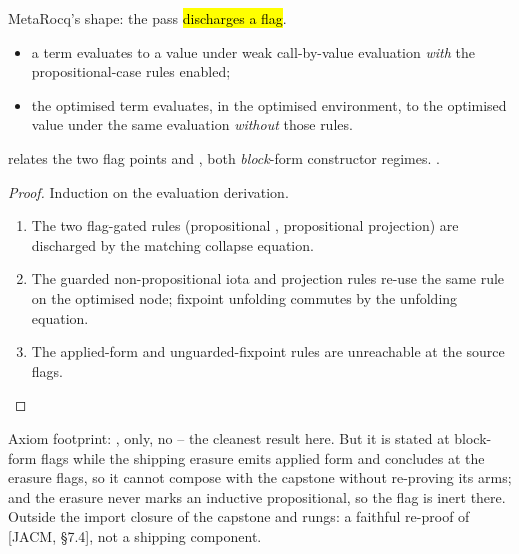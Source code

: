 \begin{theorem}
\label{thm:LBOptimize_correct}
\leanok
{}
 MetaRocq's  shape: the pass \hl{discharges a flag}.
\begin{itemize}
\item {} a \lbox{} term evaluates to a value under weak call-by-value evaluation \emph{with}
the propositional-case rules enabled;
\item {} the optimised term evaluates, in the optimised environment, to the optimised value
under the same evaluation \emph{without} those rules.
\end{itemize}
 relates the two flag points  and , both
\emph{block}-form constructor regimes.
 \stProved{}.
\end{theorem}
\begin{proof}
\leanok
{}
 Induction on the evaluation derivation.
\begin{enumerate}
\item The two flag-gated rules (propositional , propositional projection) are discharged by
the matching collapse equation.
\item The guarded non-propositional iota and projection rules re-use the same rule on the optimised
node; fixpoint unfolding commutes by the unfolding equation.
\item The applied-form and unguarded-fixpoint rules are unreachable at the source flags.
\end{enumerate}
\end{proof}

\begin{remark}
 Axiom footprint: ,  only, no  -- the
cleanest result here. But it is stated at block-form flags while the shipping erasure emits applied form
and concludes at the erasure flags, so it cannot compose with the capstone without re-proving its arms;
and the erasure never marks an inductive propositional, so the flag is inert there. Outside the import
closure of the capstone and rungs: a faithful re-proof of [JACM, \S7.4], not a shipping component.
\end{remark}


